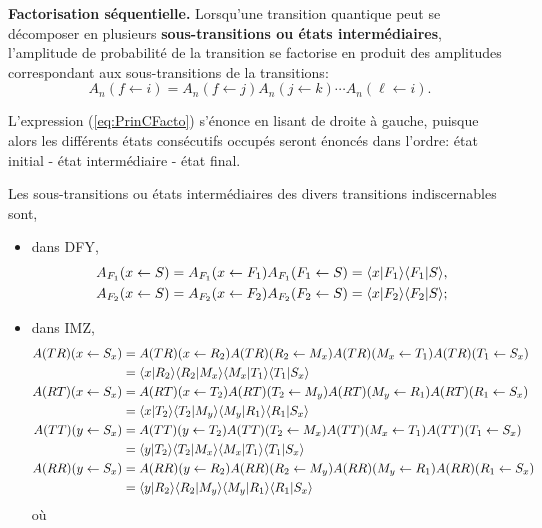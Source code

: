 \begin{enumerate}
\colorbox[gray]{0.8}{
\parbox[c]{0.9\textwidth}{
\begin{principe}
\textbf{Factorisation séquentielle.} Lorsqu'une transition quantique peut se
décomposer en plusieurs \textbf{sous-transitions ou états intermédiaires},
l'amplitude de probabilité de la transition se factorise en produit des
amplitudes correspondant aux sous-transitions de la transitions:
\begin{equation}
A_{n}(f\leftarrow i)=A_{n}(f\leftarrow j)A_{n}(j\leftarrow k)\cdots
A_{n}(\ell\leftarrow i).\label{eq:PrinCFacto}\end{equation}
\end{principe}
}}

L'expression (\ref{eq:PrinCFacto}) s'énonce en lisant de droite à gauche,
puisque alors les différents états consécutifs occupés seront énoncés dans
l'ordre: état initial - état intermédiaire - état final.

Les sous-transitions ou états intermédiaires des divers transitions
indiscernables sont,

\begin{itemize}
\item dans DFY,%
\begin{subequations}%
\begin{align}
A_{F_1}(x\leftarrow S) =A_{F_1}(x\leftarrow F_1)A_{F_1}%
(F_1\leftarrow S)=\langle x\ket{F_1} \langle F_1\ket{S} ,\\
A_{F_2}(x\leftarrow S) =A_{F_2}(x\leftarrow F_2)A_{F_2}%
(F_2\leftarrow S)=\langle x\ket{F_2} \langle F_2\ket{S} ;
\end{align}%
\end{subequations}%

\item dans IMZ,
\begin{subequations}%
\begin{align}
A(TR)(x\leftarrow S_{x}) & =A(TR)(x\leftarrow R_2)A(TR)(R_2\leftarrow
M_{x})A(TR)(M_{x}\leftarrow T_1)A(TR)(T_1\leftarrow S_{x})\nonumber\\
&  =\langle x\vert R_2\rangle\langle R_2\vert M_{x}\rangle\langle M_{x}\vert T_1\rangle\langle
T_1\vert S_{x}\rangle\\
A(RT)(x\leftarrow S_{x}) & =A(RT)(x\leftarrow T_2)A(RT)(T_2\leftarrow
M_{y})A(RT)(M_{y}\leftarrow R_1)A(RT)(R_1\leftarrow S_{x})\nonumber\\
&  =\langle x\vert T_2\rangle\langle T_2\vert M_{y}\rangle\langle M_{y}\vert R_1\rangle\langle
R_1\vert S_{x}\rangle\\
A(TT)(y\leftarrow S_{x}) & =A(TT)(y\leftarrow T_2)A(TT)(T_2\leftarrow
M_{x})A(TT)(M_{x}\leftarrow T_1)A(TT)(T_1\leftarrow S_{x})\nonumber\\
&  =\langle y\vert T_2\rangle\langle T_2\vert M_{x}\rangle\langle M_{x}\vert T_1\rangle\langle
T_1\vert S_{x}\rangle\\
A(RR)(y\leftarrow S_{x}) & =A(RR)(y\leftarrow R_2)A(RR)(R_2\leftarrow
M_{y})A(RR)(M_{y}\leftarrow R_1)A(RR)(R_1\leftarrow S_{x})\nonumber\\
&  =\langle y\vert R_2\rangle\langle R_2\vert M_{y}\rangle\langle M_{y}\vert R_1\rangle\langle
R_1\vert S_{x}\rangle
\end{align}%
\end{subequations}%
où


\end{itemize}
\end{enumerate}
